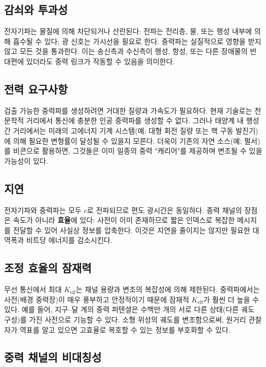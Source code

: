 \documentclass[12pt,a4paper]{article}
\newcommand{\Keff}{K_{\mathrm{eff}}}
\begin{document}
	\subsection{감쇠와 투과성}
	
	전자기파는 물질에 의해 차단되거나 산란된다: 전파는 전리층, 물, 또는 행성 내부에 의해 흡수될 수 있다; 광 신호는 가시선을 필요로 한다. 중력파는 실질적으로 영향을 받지 않고 모든 것을 통과한다. 이는 송신측과 수신측이 행성, 항성, 또는 다른 장애물의 반대편에 있더라도 중력 링크가 작동할 수 있음을 의미한다.
	
	\subsection{전력 요구사항}
	
	검출 가능한 중력파를 생성하려면 거대한 질량과 가속도가 필요하다. 현재 기술로는 천문학적 거리에서 통신에 충분한 인공 중력파를 생성할 수 없다. 그러나 태양계 내 행성간 거리에서는 미래의 고에너지 기계 시스템(예: 대형 회전 질량 또는 핵 구동 발진기)에 의해 필요한 변형률이 달성될 수 있을지 모른다. 더욱이 기존의 자연 소스(예: 펄서)를 비콘으로 활용하면, 그것들은 이미 일종의 중력 "캐리어"를 제공하며 변조될 수 있을 가능성이 있다.
	
	\subsection{지연}
	
	전자기파와 중력파는 모두 \(c\)로 전파되므로 편도 광시간은 동일하다. 중력 채널의 장점은 속도가 아니라 \textbf{효율}에 있다: 사전이 이미 존재하므로 짧은 인덱스로 복잡한 메시지를 전달할 수 있어 사실상 정보를 압축한다. 이것은 지연을 줄이지는 않지만 필요한 대역폭과 비트당 에너지를 감소시킨다.
	
	\subsection{조정 효율의 잠재력}
	
	무선 통신에서 최대 \(\Keff\)는 채널 용량과 변조의 복잡성에 의해 제한된다. 중력파에서는 사전(배경 중력장)이 매우 풍부하고 안정적이기 때문에 잠재적 \(\Keff\)가 훨씬 더 높을 수 있다. 예를 들어, 지구–달 계의 중력 퍼텐셜은 수백만 개의 서로 다른 상태(다른 궤도 구성)를 가진 사전으로 기능할 수 있다. 소형 위성의 궤도를 변조함으로써, 원거리 관찰자가 역표를 알고 있으면 고효율로 복호할 수 있는 정보를 부호화할 수 있다.
	
	\subsection{중력 채널의 비대칭성}
	\label{subsec:asymmetry}
	
\end{document}
